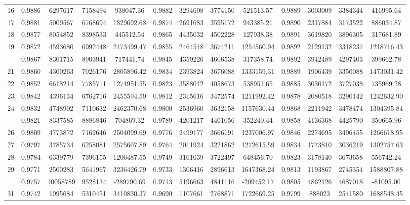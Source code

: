 \documentclass[
  12pt,
]{article}
\begin{document}
\begin{longtable}[t]{lcccccccccccc}
16 & 0.9886 & 6297617 & 7158494 & 938047.36 & 0.9882 & 3294608 & 3774150 & 521513.57 & 0.9889 & 3003009 & 3384344 & 416995.64\\
17 & 0.9881 & 5009567 & 6768694 & 1829692.68 & 0.9874 & 2691683 & 3595172 & 943385.21 & 0.9890 & 2317884 & 3173522 & 886034.87\\
18 & 0.9877 & 8054852 & 8398533 & 445512.54 & 0.9865 & 4435032 & 4502228 & 127938.38 & 0.9891 & 3619820 & 3896305 & 317681.89\\
19 & 0.9872 & 4593680 & 6992448 & 2473499.47 & 0.9855 & 2464548 & 3674211 & 1254560.94 & 0.9892 & 2129132 & 3318237 & 1218716.43\\
\addlinespace
20 & 0.9867 & 8301715 & 8903941 & 717441.74 & 0.9845 & 4359226 & 4606538 & 317358.74 & 0.9892 & 3942489 & 4297403 & 399662.78\\
21 & 0.9860 & 4300263 & 7026176 & 2805896.42 & 0.9834 & 2393824 & 3676088 & 1333159.31 & 0.9889 & 1906439 & 3350088 & 1473031.42\\
22 & 0.9852 & 6618214 & 7785711 & 1274951.55 & 0.9823 & 3588042 & 4058673 & 538951.65 & 0.9885 & 3030172 & 3727038 & 735969.28\\
23 & 0.9842 & 4396134 & 6762716 & 2455594.59 & 0.9812 & 2315616 & 3472574 & 1211992.42 & 0.9878 & 2080518 & 3290142 & 1242632.90\\
24 & 0.9832 & 4748902 & 7110632 & 2462370.68 & 0.9800 & 2536960 & 3632158 & 1157630.44 & 0.9868 & 2211942 & 3478474 & 1304395.84\\
\addlinespace
25 & 0.9821 & 8337585 & 8886846 & 704869.32 & 0.9789 & 4201217 & 4461056 & 352240.44 & 0.9858 & 4136368 & 4425790 & 350665.96\\
26 & 0.9809 & 4773872 & 7162646 & 2504099.69 & 0.9776 & 2499177 & 3666191 & 1237006.97 & 0.9846 & 2274695 & 3496455 & 1266618.95\\
27 & 0.9797 & 3785734 & 6258081 & 2575607.89 & 0.9764 & 2011924 & 3221862 & 1272615.59 & 0.9834 & 1773810 & 3036219 & 1302757.63\\
28 & 0.9784 & 6339779 & 7396155 & 1206487.55 & 0.9749 & 3161639 & 3722497 & 648456.70 & 0.9823 & 3178140 & 3673658 & 556742.24\\
29 & 0.9771 & 2500283 & 5641967 & 3236426.79 & 0.9733 & 1306416 & 2896613 & 1647368.24 & 0.9813 & 1193867 & 2745354 & 1588807.88\\
\addlinespace
30 & 0.9757 & 10058789 & 9528134 & -289790.69 & 0.9713 & 5196663 & 4841116 & -209452.17 & 0.9805 & 4862126 & 4687018 & -81095.00\\
31 & 0.9742 & 1995684 & 5310451 & 3410830.37 & 0.9690 & 1107661 & 2768871 & 1722669.25 & 0.9799 & 888023 & 2541580 & 1688548.45\\

\end{longtable}
\end{document}
